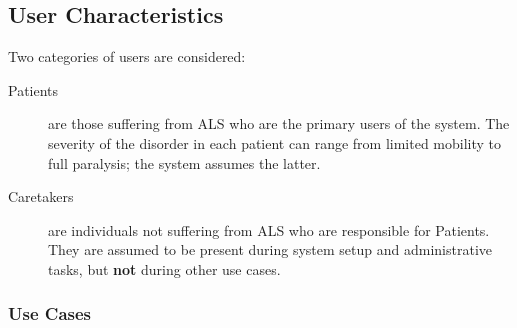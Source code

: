 \documentclass{article}
\begin{document}
\subsection{User Characteristics}
\label{sec:UserChar}
Two categories of users are considered:

\begin{description}
    \item[Patients] are those suffering from ALS who are the primary users of
        the system. The severity of the disorder in each patient can range
        from limited mobility to full paralysis; the system assumes the
        latter.
    \item[Caretakers] are individuals not suffering from ALS who are
        responsible for Patients. They are assumed to be present during system
        setup and administrative tasks, but \textbf{not} during other use
        cases.
\end{description}

\subsubsection{Use Cases}

\end{document}
